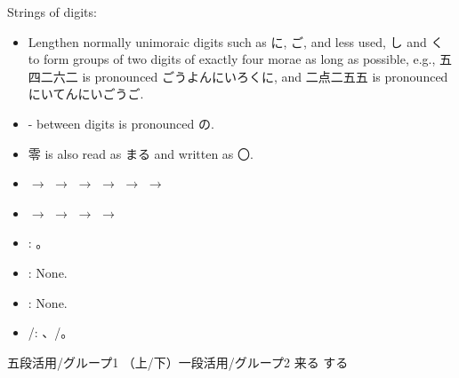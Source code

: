 \documentclass[a4paper,12pt]{article}
\begin{document}
Strings of digits:
\begin{itemize}
\item Lengthen normally unimoraic digits such as に, ご, and less used, し and く to form groups of two digits of exactly four morae as long as possible, e.g., 五四二六二 is pronounced ごうよんにいろくに, and 二点二五五 is pronounced にいてんにいごうご.
\item - between digits is pronounced の.
\item 零 is also read as まる and written as 〇.
\end{itemize}
\begin{itemize}
\item {} $\rightarrow$  $\rightarrow$  $\rightarrow$  $\rightarrow$  $\rightarrow$  $\rightarrow$ 
\item {} $\rightarrow$  $\rightarrow$  $\rightarrow$  $\rightarrow$ 
\item {}: 。
\item {}: None.
\item {}: None.
\item {}/: 、/。
\end{itemize}

五段活用/グループ1
（上/下）一段活用/グループ2
来る
する
\end{document}

